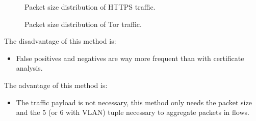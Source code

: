 \documentclass[documentation]{subfiles}
\begin{document}
\begin{figure}[!ht]
  \centering
  \caption{Packet size distribution of HTTPS traffic.}
  \label{fig:tor_https_distrib}
\end{figure}

\begin{figure}[!ht]
  \centering
  \caption{Packet size distribution of Tor traffic.}
  \label{fig:tor_tor_distrib}
\end{figure}

The disadvantage of this method is:
\begin{itemize}
    \item False positives and negatives are way more frequent than with certificate analysis.
\end{itemize}

The advantage of this method is:
\begin{itemize}
    \item The traffic payload is not necessary, this method only needs the packet size and
        the 5 (or 6 with VLAN) tuple necessary to aggregate packets in flows.
\end{itemize}

\clearpage
\end{document}
